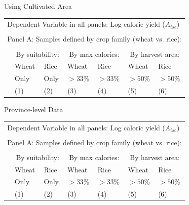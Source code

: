 \documentclass[10pt, xcolor=dvipsnames]{beamer}
\begin{document}
\begin{frame}{Using Cultivated Area}

{\footnotesize
\begin{tabularx}{\textwidth}{lXXXXXX}
\midrule
\multicolumn{7}{l}{Dependent Variable in all panels: Log caloric yield ($A_{isc}$)} \\ \\
\multicolumn{7}{l}{Panel A: Samples defined by crop family (wheat vs. rice):} \\ \\
 & \multicolumn{2}{c}{By suitability:} & \multicolumn{2}{c}{By max calories:} & \multicolumn{2}{c}{By harvest area:}\\ \cmidrule(lr){2-3} \cmidrule(lr){4-5} \cmidrule(lr){6-7} 
 & Wheat & Rice & Wheat  & Rice  & Wheat  & Rice \\
 & Only & Only &  $>33\%$ & $>33\%$ & $>50\%$ & $>50\%$   \\
 & (1) & (2) & (3) & (4) & (5) & (6) \\
\midrule

\midrule
\end{tabularx}
}

\end{frame}

\begin{frame}{Province-level Data}\label{regprov}

{\footnotesize
\begin{tabularx}{\textwidth}{lXXXXXX}
\midrule
\multicolumn{7}{l}{Dependent Variable in all panels: Log caloric yield ($A_{isc}$)} \\ \\
\multicolumn{7}{l}{Panel A: Samples defined by crop family (wheat vs. rice):} \\ \\
 & \multicolumn{2}{c}{By suitability:} & \multicolumn{2}{c}{By max calories:} & \multicolumn{2}{c}{By harvest area:}\\ \cmidrule(lr){2-3} \cmidrule(lr){4-5} \cmidrule(lr){6-7} 
 & Wheat & Rice & Wheat  & Rice  & Wheat  & Rice \\
 & Only & Only &  $>33\%$ & $>33\%$ & $>50\%$ & $>50\%$   \\
 & (1) & (2) & (3) & (4) & (5) & (6) \\
\midrule

\midrule
\end{tabularx}
}

\hfill \hyperlink{robustness}{}
\end{frame}
\end{document}
